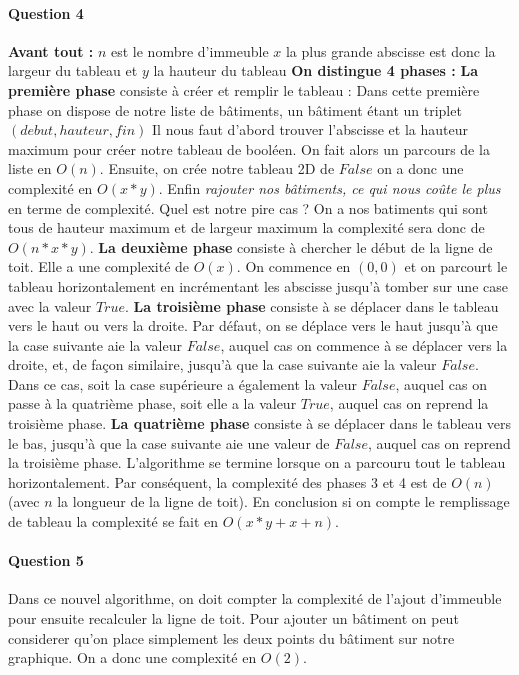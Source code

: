 \documentclass[a4paper,10pt]{article}
\begin{document}
\paragraph{Question 4}
\textbf{Avant tout :} $n$ est le nombre d'immeuble $x$ la plus grande abscisse est donc la largeur du tableau et $y$ la hauteur du tableau\newline \newline
\textbf{On distingue 4 phases :} \newline \newline
\textbf{La première phase} consiste à créer et remplir le tableau :\newline
Dans cette première phase on dispose de notre liste de bâtiments, un bâtiment étant un triplet $(debut, hauteur, fin)$\newline
Il nous faut d'abord trouver l'abscisse et la hauteur maximum pour créer notre tableau de booléen. On fait alors un parcours de la liste en $O(n)$. 
Ensuite, on crée notre tableau 2D de $False$ on a donc une complexité en $O(x*y)$.
Enfin \emph{rajouter nos bâtiments, ce qui nous coûte le plus} en terme de complexité.
Quel est notre pire cas ? On a nos batiments qui sont tous de hauteur maximum et de largeur maximum la complexité sera donc de $O(n*x*y)$.\newline
\textbf{La deuxième phase} consiste à chercher le début de la ligne de toit. Elle a une complexité de $O(x)$. On commence en $(0,0)$ et 
on parcourt le tableau horizontalement en incrémentant les abscisse jusqu'à tomber sur une case avec la valeur $True$.\newline
\textbf{La troisième phase} consiste à se déplacer dans le tableau vers le haut ou vers la droite. Par défaut, on se déplace vers le haut jusqu'à que la case suivante aie la valeur $False$, 
auquel cas on commence à se déplacer vers la droite, et, de façon similaire, jusqu'à que la case suivante aie la valeur $False$. 
Dans ce cas, soit la case supérieure a également la valeur $False$, auquel cas on passe à la quatrième phase, soit elle a la valeur $True$, auquel cas on reprend la troisième phase.\newline
\textbf{La quatrième phase} consiste à se déplacer dans le tableau vers le bas, jusqu'à que la case suivante aie une valeur de $False$, auquel cas on reprend la troisième phase.\newline
L'algorithme se termine lorsque on a parcouru tout le tableau horizontalement.\newline
Par conséquent, la complexité des phases 3 et 4 est de $O(n)$ (avec $n$ la longueur de la ligne de toit).
En conclusion si on compte le remplissage de tableau la complexité se fait en $O(x*y + x + n)$.
\paragraph{Question 5}
Dans ce nouvel algorithme, on doit compter la complexité de l'ajout d'immeuble pour ensuite recalculer la ligne de toit.
Pour ajouter un bâtiment on peut considerer qu'on place simplement les deux points du bâtiment sur notre graphique. 
On a donc une complexité en $O(2)$.
\end{document}
